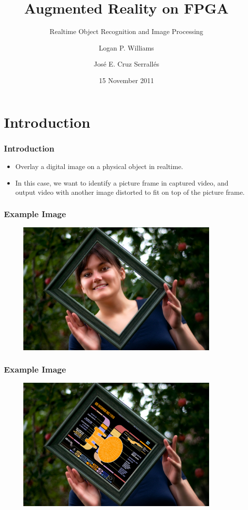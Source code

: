 \documentclass{beamer}
\title[Augmented Reality on FPGA]{Augmented Reality on FPGA}
\subtitle{Realtime Object Recognition and Image Processing}
\author{Logan P. Williams \and Jos\'{e} E. Cruz Serrall\'{e}s}
\date{15 November 2011}
\begin{document}
\begin{frame}
	\titlepage
\end{frame}

\section{Introduction}
\begin{frame}
	\frametitle{Introduction}
	\begin{itemize}
		\item Overlay a digital image on a physical object in realtime.
		\item In this case, we want to identify a picture frame in captured video, and output video with another image distorted to fit on top of the picture frame.
	\end{itemize}
\end{frame}

\begin{frame}
	\frametitle{Example Image}
	\begin{figure}
		\centering
		\includegraphics[width=0.9\textwidth]{example1.png}
	\end{figure}
\end{frame}

\begin{frame}
	\frametitle{Example Image}
	\begin{figure}
		\centering
		\includegraphics[width=0.9\textwidth]{example2.jpg}
	\end{figure}
\end{frame}
\end{document}

